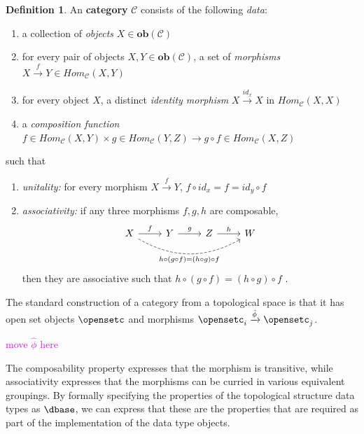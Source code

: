 \documentclass[journal]{IEEEtran}
\newcommand{\note}[1]{\textcolor{magenta}{#1}}
\theoremstyle{definition}
\newtheorem{definition}{Definition}[section]
\theoremstyle{remark}
\begin{document}
\begin{definition}\label{def:atct:category}
   An \textbf{category} $\mathcal{C}$ consists of the following \textit{data}:
\begin{enumerate}
  \item a collection of \textit{objects} $X \in \textbf{ob}(\mathcal{C})$
  \item for every pair of objects $X, Y \in \textbf{ob}(\mathcal{C})$, a set of \textit{morphisms} $X \xrightarrow{f} Y \in Hom_{\mathcal{C}}(X, Y)$
  \item for every object $X$, a distinct \textit{identity morphism} $X \xrightarrow {id_x} X$ in $Hom_{\mathcal{C}}(X, X)$
  \item a \textit{composition function} $f \in Hom_{\mathcal{C}}(X, Y) \times  g \in Hom_{\mathcal{C}}(Y, Z) \rightarrow g \circ f \in Hom_{\mathcal{C}}(X, Z)$
\end{enumerate}
such that
\begin{enumerate}
  \item \textit{unitality:} for every morphism $ X \xrightarrow{f} Y$, $f \circ id_x = f = id_y \circ f$
  \item \textit{associativity:} if any three morphisms $f, g, h$ are composable,
    \begin{equation*}
      \begin{tikzcd}
        X \arrow[r, "f"] \arrow[rrr, "h\circ(g\circ f) = (h\circ g)\circ f"', bend right, dashed] & Y  \arrow[r, "g"] & Z \arrow[r, "h"] & W
        \end{tikzcd}
  \end{equation*}
  then they are associative such that $h\circ(g\circ f) = (h \circ g) \circ f$  \cite{lawvere2009conceptual,riehlCategoryTheoryContext,maclaneCategoriesWorkingMathematician2013,fongInvitationAppliedCategory2019}.
  \end{enumerate}
\end{definition}

The standard construction of a category from a topological space is that it has open set objects $\opensetc$ and morphisms $\opensetc_i \xrightarrow{\hat{\phi}} \opensetc_j$\cite{riehlCategoryTheoryContext}.

\note{move $\hat{\phi}$ here}

The composability property expresses that the morphism is transitive, while associativity expresses that the morphisms can be curried in various equivalent groupings. By formally specifying the properties of the topological structure data types as $\mathcal{\dbase}$, we can express that these are the properties that are required as part of the implementation of the data type objects.
\end{document}
